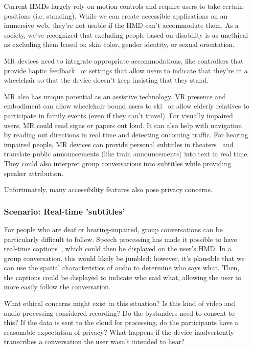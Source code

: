 Current HMDs largely rely on motion controls and require users to take certain positions (i.e. standing). While we can create accessible applications on an immersive web, they're not usable if the HMD can't accommodate them. As a society, we've recognized that excluding people based on disability is as unethical as excluding them based on skin color, gender identity, or sexual orientation.

MR devices need to integrate appropriate accommodations, like controllers that provide haptic feedback~\cite{zhao2018demonstration} or settings that allow users to indicate that they're in a wheelchair so that the device doesn't keep insisting that they stand.

MR also has unique potential as an assistive technology. VR presence and embodiment can allow wheelchair bound users to ski~\cite{harrell} or allow elderly relatives to participate in family events (even if they can't travel). For visually impaired users, MR could read signs or papers out loud. It can also help with navigation by reading out directions in real time and detecting oncoming traffic. For hearing impaired people, MR devices can provide personal subtitles in theaters~\cite{forrest} and translate public announcements (like train announcements) into text in real time. They could also interpret group conversations into subtitles while providing speaker attribution.

Unfortunately, many accessibility features also pose privacy concerns.

\subsubsection{Scenario: Real-time 'subtitles'}

For people who are deaf or hearing-impaired, group conversations can be particularly difficult to follow. Speech processing has made it possible to have real-time captions~\cite{welch}, which could then be displayed on the user's HMD. In a group conversation, this would likely be jumbled; however, it's plausible that we can use the spatial characteristics of audio to determine who says what. Then, the captions could be displayed to indicate who said what, allowing the user to more easily follow the conversation.

What ethical concerns might exist in this situation? Is this kind of video and audio processing considered recording? Do the bystanders need to consent to this? If the data is sent to the cloud for processing, do the participants have a reasonable expectation of privacy? What happens if the device inadvertently transcribes a conversation the user wasn't intended to hear?

